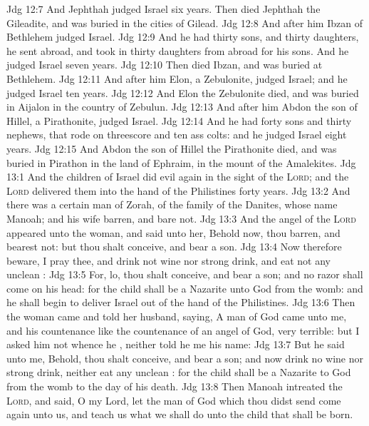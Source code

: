 \vs Jdg 12:7 And Jephthah judged Israel six years. Then died Jephthah the Gileadite, and was buried in  the cities of Gilead.
\vs Jdg 12:8 And after him Ibzan of Bethlehem judged Israel.
\vs Jdg 12:9 And he had thirty sons, and thirty daughters,  he sent abroad, and took in thirty daughters from abroad for his sons. And he judged Israel seven years.
\vs Jdg 12:10 Then died Ibzan, and was buried at Bethlehem.
\vs Jdg 12:11 And after him Elon, a Zebulonite, judged Israel; and he judged Israel ten years.
\vs Jdg 12:12 And Elon the Zebulonite died, and was buried in Aijalon in the country of Zebulun.
\vs Jdg 12:13 And after him Abdon the son of Hillel, a Pirathonite, judged Israel.
\vs Jdg 12:14 And he had forty sons and thirty nephews, that rode on threescore and ten ass colts: and he judged Israel eight years.
\vs Jdg 12:15 And Abdon the son of Hillel the Pirathonite died, and was buried in Pirathon in the land of Ephraim, in the mount of the Amalekites.
\vs Jdg 13:1 And the children of Israel did evil again in the sight of the \textsc{Lord}; and the \textsc{Lord} delivered them into the hand of the Philistines forty years.
\vs Jdg 13:2 And there was a certain man of Zorah, of the family of the Danites, whose name  Manoah; and his wife  barren, and bare not.
\vs Jdg 13:3 And the angel of the \textsc{Lord} appeared unto the woman, and said unto her, Behold now, thou  barren, and bearest not: but thou shalt conceive, and bear a son.
\vs Jdg 13:4 Now therefore beware, I pray thee, and drink not wine nor strong drink, and eat not any unclean :
\vs Jdg 13:5 For, lo, thou shalt conceive, and bear a son; and no razor shall come on his head: for the child shall be a Nazarite unto God from the womb: and he shall begin to deliver Israel out of the hand of the Philistines.
\vs Jdg 13:6 Then the woman came and told her husband, saying, A man of God came unto me, and his countenance  like the countenance of an angel of God, very terrible: but I asked him not whence he , neither told he me his name:
\vs Jdg 13:7 But he said unto me, Behold, thou shalt conceive, and bear a son; and now drink no wine nor strong drink, neither eat any unclean : for the child shall be a Nazarite to God from the womb to the day of his death.
\vs Jdg 13:8 Then Manoah intreated the \textsc{Lord}, and said, O my Lord, let the man of God which thou didst send come again unto us, and teach us what we shall do unto the child that shall be born.
